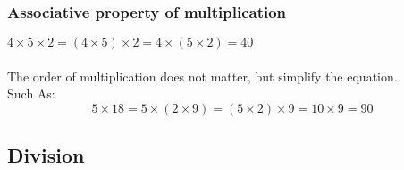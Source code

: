 \documentclass[10pt,a4paper]{article}
\begin{document}
\subsubsection{Associative property of multiplication}
$4 \times 5 \times 2 = \left(4 \times 5\right) \times 2 = 4 \times \left(5 \times 2\right) = 40$\\\\
The order of multiplication does not matter, but simplify the equation.\\
Such As:
$$5 \times 18 = 5 \times \left(2 \times 9\right) = \left(5 \times 2\right) \times 9 = 10 \times 9 = 90$$

\subsection{Division}
\end{document}
